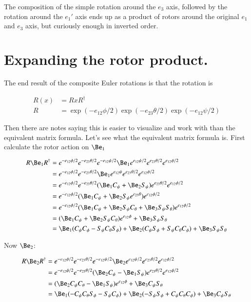 \documentclass{article}
\begin{document}
The composition of the simple rotation around the $e_3$ axis, followed by the rotation around the $e_1'$ axis ends up
as a product of rotors around the original $e_1$ and $e_3$ axis, but curiously enough in inverted order.

\section{ Expanding the rotor product. }

The end result of the composite Euler rotations is that the rotation is

\begin{align*}
R(x) &= R x R^\dagger \\
R &= \exp(-e_{12}\phi/2) \exp(-e_{23}\theta/2) \exp(-e_{12}\psi/2)
\end{align*}

Then there are notes saying this is easier to visualize and work with than
the equivalent matrix formula.  Let's see what the equivalent matrix formula
is.  First calculate the rotor action on $\Be_1$

\begin{align*}
R \Be_1 R^\dagger
&= 
e^{-e_{12}\phi/2} e^{-e_{23}\theta/2} e^{-e_{12}\psi/2}
\Be_1
e^{e_{12}\psi/2}
e^{e_{23}\theta/2} 
e^{e_{12}\phi/2} \\
&= 
e^{-e_{12}\phi/2} e^{-e_{23}\theta/2} 
\Be_1 e^{e_{12}\psi}
e^{e_{23}\theta/2} 
e^{e_{12}\phi/2} \\
&= 
e^{-e_{12}\phi/2} e^{-e_{23}\theta/2} 
(\Be_1 C_\psi + \Be_2 S_\psi)
e^{e_{23}\theta/2} 
e^{e_{12}\phi/2} \\
&= 
e^{-e_{12}\phi/2} 
(\Be_1 C_\psi + \Be_2 S_\psi e^{e_{23}\theta} )
e^{e_{12}\phi/2} \\
&= 
e^{-e_{12}\phi/2} 
(\Be_1 C_\psi + \Be_2 S_\psi C_\theta + \Be_3 S_\psi S_\theta )
e^{e_{12}\phi/2} \\
&= 
(\Be_1 C_\psi + \Be_2 S_\psi C_\theta ) e^{e_{12}\phi} 
+ \Be_3 S_\psi S_\theta  \\
&= 
  \Be_1 (C_\psi C_\phi - S_\psi C_\theta S_\phi)
+ \Be_2 (C_\psi S_\phi + S_\psi C_\theta C_\phi)
+ \Be_3 S_\psi S_\theta  \\
\end{align*}

Now $\Be_2$:

\begin{align*}
R \Be_2 R^\dagger
&= 
e^{-e_{12}\phi/2} e^{-e_{23}\theta/2} e^{-e_{12}\psi/2}
\Be_2
e^{e_{12}\psi/2}
e^{e_{23}\theta/2} 
e^{e_{12}\phi/2} \\
&= 
e^{-e_{12}\phi/2} e^{-e_{23}\theta/2} 
(\Be_2 C_\psi - \Be_1 S_\psi)
e^{e_{23}\theta/2} 
e^{e_{12}\phi/2} \\
&= 
(\Be_2 C_\psi C_\theta
- \Be_1 S_\psi)
e^{e_{12}\phi} 
+\Be_3 C_\psi S_\theta \\
&= 
\Be_1 (-C_\psi C_\theta S_\phi - S_\psi C_\phi)
+ \Be_2 (-S_\psi S_\phi + C_\psi C_\theta C_\phi)
+ \Be_3 C_\psi S_\theta \\
\end{align*}
\end{document}
